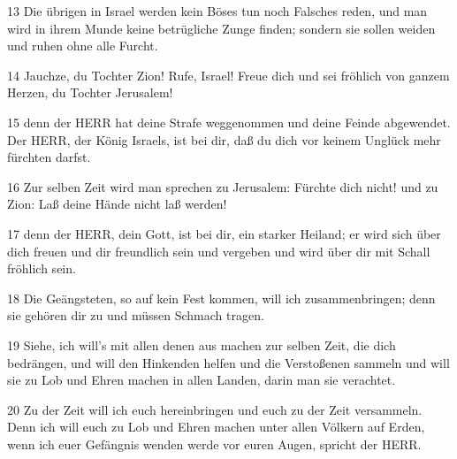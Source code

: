 \par 13 Die übrigen in Israel werden kein Böses tun noch Falsches reden, und man wird in ihrem Munde keine betrügliche Zunge finden; sondern sie sollen weiden und ruhen ohne alle Furcht.
\par 14 Jauchze, du Tochter Zion! Rufe, Israel! Freue dich und sei fröhlich von ganzem Herzen, du Tochter Jerusalem!
\par 15 denn der HERR hat deine Strafe weggenommen und deine Feinde abgewendet. Der HERR, der König Israels, ist bei dir, daß du dich vor keinem Unglück mehr fürchten darfst.
\par 16 Zur selben Zeit wird man sprechen zu Jerusalem: Fürchte dich nicht! und zu Zion: Laß deine Hände nicht laß werden!
\par 17 denn der HERR, dein Gott, ist bei dir, ein starker Heiland; er wird sich über dich freuen und dir freundlich sein und vergeben und wird über dir mit Schall fröhlich sein.
\par 18 Die Geängsteten, so auf kein Fest kommen, will ich zusammenbringen; denn sie gehören dir zu und müssen Schmach tragen.
\par 19 Siehe, ich will's mit allen denen aus machen zur selben Zeit, die dich bedrängen, und will den Hinkenden helfen und die Verstoßenen sammeln und will sie zu Lob und Ehren machen in allen Landen, darin man sie verachtet.
\par 20 Zu der Zeit will ich euch hereinbringen und euch zu der Zeit versammeln. Denn ich will euch zu Lob und Ehren machen unter allen Völkern auf Erden, wenn ich euer Gefängnis wenden werde vor euren Augen, spricht der HERR.

